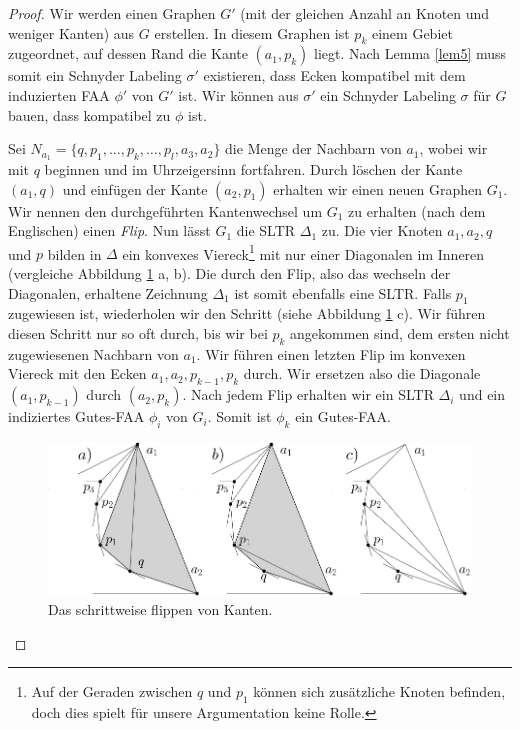 \begin{proof}
Wir werden einen Graphen $G'$ (mit der gleichen Anzahl an Knoten und weniger Kanten) aus $G$ erstellen. In diesem Graphen ist $p_k$ einem Gebiet zugeordnet, auf dessen Rand die Kante $(a_1,p_k)$ liegt. Nach Lemma \ref{lem5} muss somit ein Schnyder Labeling $\sigma'$ existieren, dass Ecken kompatibel mit dem induzierten FAA $\phi'$ von $G'$ ist. Wir können aus $\sigma'$ ein Schnyder Labeling $\sigma$ für $G$ bauen, dass kompatibel zu $\phi$ ist.

Sei $N_{a_1} = \{q,p_1,\ldots,p_k,\ldots,p_l,a_3,a_2\}$ die Menge der Nachbarn von $a_1$, wobei wir mit $q$ beginnen und im Uhrzeigersinn fortfahren. Durch löschen der Kante $(a_1,q)$ und einfügen der Kante $(a_2,p_1)$ erhalten wir einen neuen Graphen $G_1$. Wir nennen den durchgeführten Kantenwechsel um $G_1$ zu erhalten (nach dem Englischen) einen \textit{Flip}. Nun lässt $G_1$ die SLTR $\Delta_1$ zu. Die vier Knoten $a_1,a_2,q$ und $p$ bilden in $\Delta$ ein konvexes Viereck\footnote{Auf der Geraden zwischen $q$ und $p_1$ können sich zusätzliche Knoten befinden, doch dies spielt für unsere Argumentation keine Rolle.} mit nur einer Diagonalen im Inneren (vergleiche Abbildung \ref{pic_lem6_2} a, b). Die durch den Flip, also das wechseln der Diagonalen, erhaltene Zeichnung $\Delta_1$ ist somit ebenfalls eine SLTR. Falls $p_1$ zugewiesen ist, wiederholen wir den Schritt (siehe Abbildung \ref{pic_lem6_2} c). Wir führen diesen Schritt nur so oft durch, bis wir bei $p_k$ angekommen sind, dem ersten nicht zugewiesenen Nachbarn von $a_1$. Wir führen einen letzten Flip im konvexen Viereck mit den Ecken $a_1,a_2,p_{k-1},p_k$ durch. Wir ersetzen also die Diagonale $(a_1,p_{k-1})$ durch $(a_2,p_{k})$. Nach jedem Flip erhalten wir ein SLTR $\Delta_i$ und ein indiziertes Gutes-FAA $\phi_i$ von $G_i$. Somit ist $\phi_k$ ein Gutes-FAA.

\begin{figure}
	\centering
	  \includegraphics[width=1\textwidth]{lem6_2.png}
    	\caption{Das schrittweise flippen von Kanten.}
    	\label{pic_lem6_2}
\end{figure}


\end{proof}
